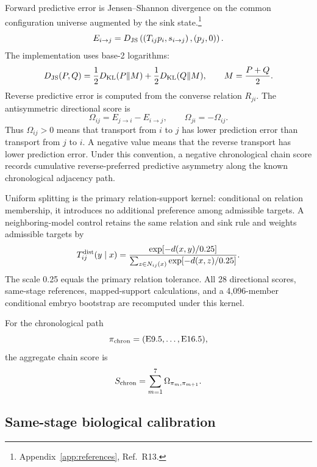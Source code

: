 \documentclass[11pt]{article}
\begin{document}
Forward predictive error is Jensen--Shannon divergence on the common configuration universe augmented by the sink state.\footnote{Appendix~\ref{app:references}, Ref.~R13.}
\begin{equation}
E_{i\rightarrow j}
=
D_{\rm JS}
\left(
\left(T_{ij}p_i,s_{i\rightarrow j}\right),
\left(p_j,0\right)
\right).
\label{eq:forwarderror}
\end{equation}
The implementation uses base-2 logarithms:
\[
D_{\rm JS}(P,Q)
=
\frac12 D_{\rm KL}(P\|M)
+
\frac12 D_{\rm KL}(Q\|M),
\qquad
M=\frac{P+Q}{2}.
\]
Reverse predictive error is computed from the converse relation \(R_{ji}\). The antisymmetric directional score is
\begin{equation}
\Omega_{ij}
=
E_{j\rightarrow i}
-
E_{i\rightarrow j},
\qquad
\Omega_{ji}=-\Omega_{ij}.
\label{eq:omega}
\end{equation}
Thus \(\Omega_{ij}>0\) means that transport from \(i\) to \(j\) has lower prediction error than transport from \(j\) to \(i\). A negative value means that the reverse transport has lower prediction error. Under this convention, a negative chronological chain score records cumulative reverse-preferred predictive asymmetry along the known chronological adjacency path.

Uniform splitting is the primary relation-support kernel: conditional on relation membership, it introduces no additional preference among admissible targets. A neighboring-model control retains the same relation and sink rule and weights admissible targets by
\begin{equation}
T_{ij}^{\rm dist}(y\mid x)
=
\frac{\exp[-d(x,y)/0.25]}
{\sum_{z\in N_{ij}(x)}\exp[-d(x,z)/0.25]}.
\label{eq:distancekernel}
\end{equation}
The scale 0.25 equals the primary relation tolerance. All 28 directional scores, same-stage references, mapped-support calculations, and a 4,096-member conditional embryo bootstrap are recomputed under this kernel.

For the chronological path
\[
\pi_{\rm chron}
=
({\rm E9.5},\ldots,{\rm E16.5}),
\]
the aggregate chain score is
\begin{equation}
S_{\rm chron}
=
\sum_{m=1}^{7}
\Omega_{\pi_m,\pi_{m+1}}.
\label{eq:pathscore}
\end{equation}

\subsection{Same-stage biological calibration}
\end{document}
